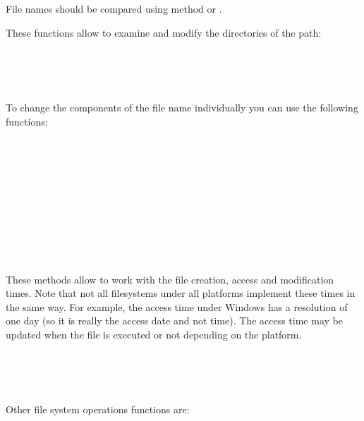 File names should be compared using  method
or .


These functions allow to examine and modify the directories of the path:

\\
\\
\\

To change the components of the file name individually you can use the
following functions:

\\
\\
\\
\\
\\
\\
\\
\\
\\


These methods allow to work with the file creation, access and modification
times. Note that not all filesystems under all platforms implement these times
in the same way. For example, the access time under Windows has a resolution of
one day (so it is really the access date and not time). The access time may be
updated when the file is executed or not depending on the platform.

\\
\\
\\

Other file system operations functions are:

\\

